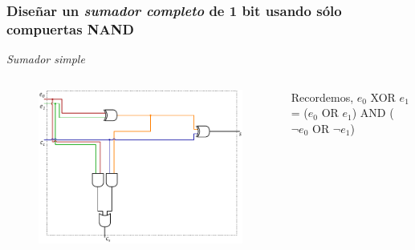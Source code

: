 \documentclass[mathserif,hyperref]{beamer}
\begin{document}
\begin{frame}[t]
\frametitle{\small Diseñar un \textit{sumador completo} de 1 bit usando sólo
compuertas NAND}
\textit{Sumador simple}
\begin{columns}[T]
  \begin{figure}[htp]
    \includegraphics[scale=0.6]{sumador-completo.pdf}
  \end{figure}

  Recordemos, $e_0$ XOR $e_1$ = ($e_0$ OR $e_1$) AND ($\lnot e_0$ OR $\lnot
  e_1$)
\end{columns}
\end{frame}
\end{document}
